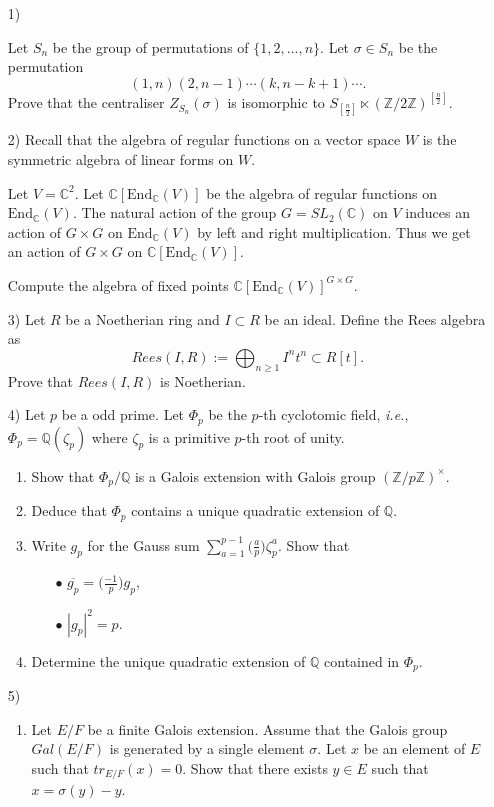 \documentclass[10pt]{article}
\begin{document}
\begin{itemize}

\item[1)]

Let $S_n$ be the group of permutations of $\{1,2,...,n\}$. Let
$\sigma\in S_n$ be the permutation \[(1,n)(2,n-1)\cdots
(k,n-k+1)\cdots.\]
 Prove that the centraliser $Z_{S_n}(\sigma)$ is isomorphic to $S_{[\frac{n}{2}]}\ltimes (\mathbb{Z}/2\mathbb{Z})^{[\frac{n}{2}]}$.



\item[2)]
Recall that the algebra of regular functions on a vector space $W$ is the symmetric algebra of linear forms on $W$.

Let $V=\mathbb{C}^2$. Let $\mathbb{C}[\mathrm{End}_{\mathbb{C}}(V)]$  be the algebra of regular functions on $\mathrm{End}_{\mathbb{C}}(V)$.
The natural action of the group $G=SL_2(\mathbb{C})$ on $V$ induces an action of $G\times G$ on $\mathrm{End}_{\mathbb{C}}(V)$ by left and right multiplication.
Thus we get an action of $G\times G$ on $\mathbb{C}[\mathrm{End}_{\mathbb{C}}(V)]$.

Compute the algebra of fixed points $\mathbb{C}[\mathrm{End}_{\mathbb{C}}(V)]^{G\times G}$.

\item[3)]
Let $R$ be a Noetherian ring and $I\subset R$ be an ideal. Define the Rees algebra as $$Rees(I,R):=\bigoplus_{n\geqslant 1} I^n t^n\subset R[t].$$
Prove that $Rees(I,R)$ is Noetherian.

\item[4)]
Let $p$ be a odd prime. Let $\Phi_p$ be the $p$-th cyclotomic field, \emph{i.e.}, $\Phi_p=\mathbb{Q}(\zeta_p)$ where $\zeta_p$ is a primitive $p$-th root of unity.

\begin{enumerate}
\item Show that $\Phi_p/\mathbb{Q}$ is a Galois extension with Galois group $(\mathbb{Z}/p\mathbb{Z})^\times$.
\item Deduce that $\Phi_p$ contains a unique quadratic extension of $\mathbb{Q}$.
\item Write $g_p$ for the Gauss sum $\sum_{a=1}^{p-1}\big(\frac{a }{p}\big)\zeta_p^a$. Show that
\begin{itemize}
\item[$\bullet$] $\overline{g_p}=\big(\frac{-1}{p}\big) g_p$,
\item[$\bullet$] $|g_p|^2=p$.
\end{itemize}
\item Determine the unique quadratic extension of $\mathbb{Q}$ contained in $\Phi_p$.
\end{enumerate}
\item[5)]
\begin{enumerate}
\item Let $E/F$ be a finite Galois extension. Assume that the Galois group $Gal(E/F)$ is generated by a single element $\sigma$. Let $x$ be an element of $E$ such that $tr_{E/F}(x)=0$. Show that there exists $y\in E$ such that $x=\sigma(y)-y$.


\end{enumerate}
\end{itemize}
\end{document}
